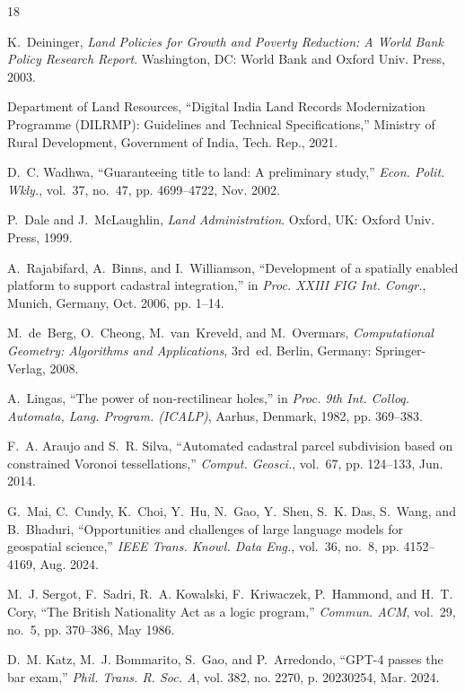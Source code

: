 \documentclass[conference]{IEEEtran}
\begin{document}
\begin{thebibliography}{18}

K.~Deininger, \emph{Land Policies for Growth and Poverty Reduction: A World Bank Policy Research Report}. Washington, DC: World Bank and Oxford Univ. Press, 2003.

Department of Land Resources, ``Digital India Land Records Modernization Programme (DILRMP): Guidelines and Technical Specifications,'' Ministry of Rural Development, Government of India, Tech. Rep., 2021.

D.~C. Wadhwa, ``Guaranteeing title to land: A preliminary study,'' \emph{Econ. Polit. Wkly.}, vol.~37, no.~47, pp. 4699--4722, Nov. 2002.

P.~Dale and J.~McLaughlin, \emph{Land Administration}. Oxford, UK: Oxford Univ. Press, 1999.

A.~Rajabifard, A.~Binns, and I.~Williamson, ``Development of a spatially enabled platform to support cadastral integration,'' in \emph{Proc. XXIII FIG Int. Congr.}, Munich, Germany, Oct. 2006, pp. 1--14.

M.~de~Berg, O.~Cheong, M.~van~Kreveld, and M.~Overmars, \emph{Computational Geometry: Algorithms and Applications}, 3rd~ed. Berlin, Germany: Springer-Verlag, 2008.

A.~Lingas, ``The power of non-rectilinear holes,'' in \emph{Proc. 9th Int. Colloq. Automata, Lang. Program. (ICALP)}, Aarhus, Denmark, 1982, pp. 369--383.

F.~A. Araujo and S.~R. Silva, ``Automated cadastral parcel subdivision based on constrained Voronoi tessellations,'' \emph{Comput. Geosci.}, vol.~67, pp. 124--133, Jun. 2014.

G.~Mai, C.~Cundy, K.~Choi, Y.~Hu, N.~Gao, Y.~Shen, S.~K. Das, S.~Wang, and B.~Bhaduri, ``Opportunities and challenges of large language models for geospatial science,'' \emph{IEEE Trans. Knowl. Data Eng.}, vol.~36, no.~8, pp. 4152--4169, Aug. 2024.

M.~J. Sergot, F.~Sadri, R.~A. Kowalski, F.~Kriwaczek, P.~Hammond, and H.~T. Cory, ``The British Nationality Act as a logic program,'' \emph{Commun. ACM}, vol.~29, no.~5, pp. 370--386, May 1986.

D.~M. Katz, M.~J. Bommarito, S.~Gao, and P.~Arredondo, ``GPT-4 passes the bar exam,'' \emph{Phil. Trans. R. Soc. A}, vol. 382, no. 2270, p. 20230254, Mar. 2024.


\end{thebibliography}
\end{document}
